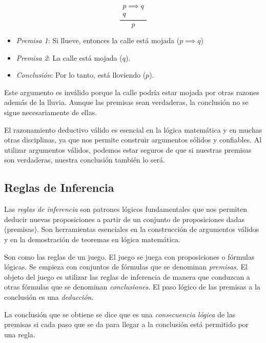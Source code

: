 \begin{fmd-example}
	\[ \frac{\begin{array}{l}
			p \implies  q\\
			q
	\end{array}}{p} \]
	\begin{itemize}
		\item \textit{Premisa 1}: Si llueve, entonces la calle está mojada ($p \implies q$)
		\item \textit{Premisa 2}: La calle está mojada ($q$).
		\item \textit{Conclusión}: Por lo tanto, está lloviendo ($p$).
	\end{itemize}
	Este argumento es inválido porque la calle podría estar mojada por otras razones además de la lluvia. Aunque las premisas sean verdaderas, la conclusión no se sigue necesariamente de ellas.
\end{fmd-example}

El razonamiento deductivo válido es esencial en la lógica matemática y en muchas otras disciplinas, ya que nos permite construir argumentos sólidos y confiables. Al utilizar argumentos válidos, podemos estar seguros de que si nuestras premisas son verdaderas, nuestra conclusión también lo será.

\subsection{Reglas de Inferencia}

Las \textit{reglas de inferencia} son patrones lógicos fundamentales que nos permiten deducir nuevas proposiciones a partir de un conjunto de proposiciones dadas (premisas). Son herramientas esenciales en la construcción de argumentos válidos y en la demostración de teoremas en lógica matemática.

Son como las reglas de un juego. El juego se juega con proposiciones o fórmulas lógicas. Se empieza con conjuntos de fórmulas que se denominan \textit{premisas}. El objeto del juego es utilizar las reglas de inferencia de manera que conduzcan a otras fórmulas que se denominan \textit{conclusiones}. El paso lógico de las premisas a la conclusión es una \textit{deducción}.\vspace{3mm}

La conclusión que se obtiene se dice que es una \textit{consecuencia lógica} de las premisas si cada paso que se da para llegar a la conclusión está permitido por una regla.\vspace{3mm}

